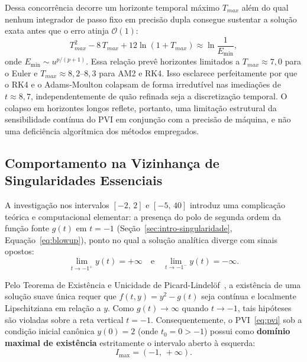 \documentclass[12pt, a4paper]{article}
\begin{document}
Dessa concorrência decorre um horizonte temporal máximo $T_{max}$ além do qual nenhum integrador de passo fixo em precisão dupla consegue sustentar a solução exata antes que o erro atinja $\mathcal{O}(1)$:
\begin{equation}\label{eq:tmax}
  T_{max}^2 - 8\,T_{max} + 12\ln(1+T_{max}) \approx \ln\frac{1}{E_{\min}},
\end{equation}
onde $E_{\min} \sim u^{p/(p+1)}$. Essa relação prevê horizontes limitados a $T_{max} \approx 7{,}0$ para o Euler e $T_{max} \approx 8{,}2$--$8{,}3$ para AM2 e RK4. Isso esclarece perfeitamente por que o RK4 e o Adams-Moulton colapsam de forma irredutível nas imediações de $t \approx 8{,}7$, independentemente de quão refinada seja a discretização temporal. O colapso em horizontes longos reflete, portanto, uma limitação estrutural da sensibilidade contínua do PVI em conjunção com a precisão de máquina, e não uma deficiência algorítmica dos métodos empregados.

\subsection{Comportamento na Vizinhança de Singularidades Essenciais}
\label{sec:d-singularidade}

A investigação nos intervalos $[-2,\, 2]$ e $[-5,\, 40]$ introduz uma complicação teórica e computacional elementar: a presença do polo de segunda ordem da função fonte $g(t)$ em $t = -1$ (Seção~\ref{sec:intro-singularidade}, Equação~\eqref{eq:blowup}), ponto no qual a solução analítica diverge com sinais opostos:
\begin{equation}
    \lim_{t \to -1^+} y(t) = +\infty \quad \text{e} \quad \lim_{t \to -1^-} y(t) = -\infty.
\end{equation}

Pelo Teorema de Existência e Unicidade de Picard-Lindelöf~\cite{suli2003,hairer1993}, a existência de uma solução suave única requer que $f(t, y) = y^2 - g(t)$ seja contínua e localmente Lipschitziana em relação a $y$. Como $g(t) \to \infty$ quando $t \to -1$, tais hipóteses são violadas sobre a reta vertical $t = -1$. Consequentemente, o PVI~\eqref{eq:pvi} sob a condição inicial canônica $y(0) = 2$ (onde $t_0 = 0 > -1$) possui como \textbf{domínio maximal de existência} estritamente o intervalo aberto à esquerda:
\begin{equation}\label{eq:d-dominio-maximal}
  I_{\max} = (-1,\, +\infty).
\end{equation}
\end{document}
